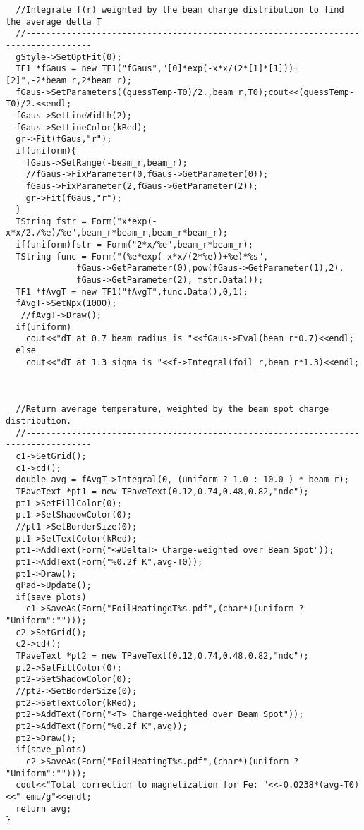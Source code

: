 \documentclass[12pt]{article}
\begin{document}
\begin{lstlisting}
  //Integrate f(r) weighted by the beam charge distribution to find the average delta T 
  //-----------------------------------------------------------------------------------
  gStyle->SetOptFit(0);
  TF1 *fGaus = new TF1("fGaus","[0]*exp(-x*x/(2*[1]*[1]))+[2]",-2*beam_r,2*beam_r);
  fGaus->SetParameters((guessTemp-T0)/2.,beam_r,T0);cout<<(guessTemp-T0)/2.<<endl;
  fGaus->SetLineWidth(2);
  fGaus->SetLineColor(kRed);
  gr->Fit(fGaus,"r");
  if(uniform){
    fGaus->SetRange(-beam_r,beam_r);
    //fGaus->FixParameter(0,fGaus->GetParameter(0));
    fGaus->FixParameter(2,fGaus->GetParameter(2));
    gr->Fit(fGaus,"r");
  }
  TString fstr = Form("x*exp(-x*x/2./%e)/%e",beam_r*beam_r,beam_r*beam_r);
  if(uniform)fstr = Form("2*x/%e",beam_r*beam_r);
  TString func = Form("(%e*exp(-x*x/(2*%e))+%e)*%s",
		      fGaus->GetParameter(0),pow(fGaus->GetParameter(1),2),
		      fGaus->GetParameter(2), fstr.Data());
  TF1 *fAvgT = new TF1("fAvgT",func.Data(),0,1);
  fAvgT->SetNpx(1000);
   //fAvgT->Draw();
  if(uniform)
    cout<<"dT at 0.7 beam radius is "<<fGaus->Eval(beam_r*0.7)<<endl;
  else
    cout<<"dT at 1.3 sigma is "<<f->Integral(foil_r,beam_r*1.3)<<endl;

  

  //Return average temperature, weighted by the beam spot charge distribution.
  //-----------------------------------------------------------------------------------
  c1->SetGrid();
  c1->cd();
  double avg = fAvgT->Integral(0, (uniform ? 1.0 : 10.0 ) * beam_r);
  TPaveText *pt1 = new TPaveText(0.12,0.74,0.48,0.82,"ndc");
  pt1->SetFillColor(0);
  pt1->SetShadowColor(0);
  //pt1->SetBorderSize(0);
  pt1->SetTextColor(kRed);
  pt1->AddText(Form("<#DeltaT> Charge-weighted over Beam Spot"));
  pt1->AddText(Form("%0.2f K",avg-T0));
  pt1->Draw();
  gPad->Update();
  if(save_plots)
    c1->SaveAs(Form("FoilHeatingdT%s.pdf",(char*)(uniform ? "Uniform":"")));
  c2->SetGrid();
  c2->cd();
  TPaveText *pt2 = new TPaveText(0.12,0.74,0.48,0.82,"ndc");
  pt2->SetFillColor(0);
  pt2->SetShadowColor(0);
  //pt2->SetBorderSize(0);
  pt2->SetTextColor(kRed);
  pt2->AddText(Form("<T> Charge-weighted over Beam Spot"));
  pt2->AddText(Form("%0.2f K",avg));
  pt2->Draw();
  if(save_plots)
    c2->SaveAs(Form("FoilHeatingT%s.pdf",(char*)(uniform ? "Uniform":"")));
  cout<<"Total correction to magnetization for Fe: "<<-0.0238*(avg-T0)<<" emu/g"<<endl;
  return avg;
}

\end{lstlisting}
\end{document}
